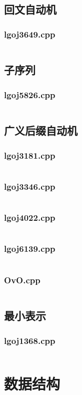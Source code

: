 \documentclass[a4paper,landscape,twocolumn]{article} %
\begin{document}
\subsection{回文自动机}
\subsubsection{lgoj3649.cpp}
\inputminted{c++}{./codes/028}
\subsection{子序列}
\subsubsection{lgoj5826.cpp}
\inputminted{c++}{./codes/029}
\subsection{广义后缀自动机}
\subsubsection{lgoj3181.cpp}
\inputminted{c++}{./codes/030}
\subsubsection{lgoj3346.cpp}
\inputminted{c++}{./codes/031}
\subsubsection{lgoj4022.cpp}
\inputminted{c++}{./codes/032}
\subsubsection{lgoj6139.cpp}
\inputminted{c++}{./codes/033}
\subsubsection{OvO.cpp}
\inputminted{c++}{./codes/034}
\subsection{最小表示}
\subsubsection{lgoj1368.cpp}
\inputminted{c++}{./codes/035}
\section{数据结构}
\end{document}
